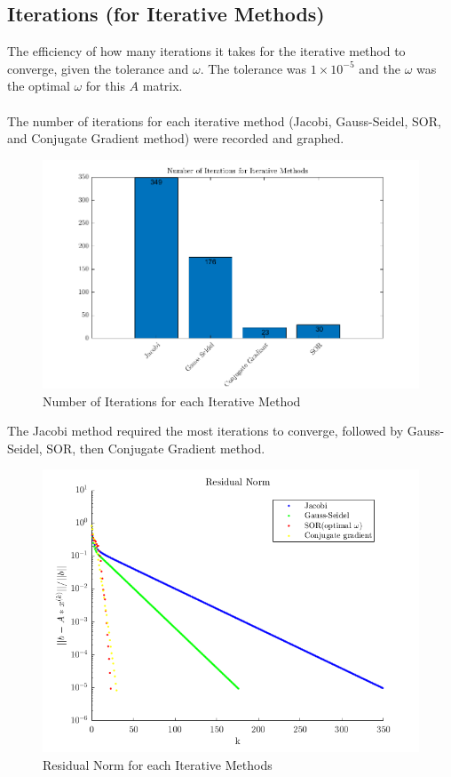 \documentclass[12pt,a4paper]{article}
\begin{document}
\subsection{Iterations (for Iterative Methods)}
The efficiency of how many iterations it takes for the iterative method to converge, given the tolerance and $\omega$. The tolerance was $1\times10^{-5}$ and the $\omega$ was the optimal $\omega$ for this $A$ matrix.
\\\\
The number of iterations for each iterative method (Jacobi, Gauss-Seidel, SOR, and Conjugate Gradient method) were recorded and graphed.
\begin{figure}[H]
	\includegraphics[width=\linewidth]{images/IterationsGraph.png}
	\caption{Number of Iterations for each Iterative Method}
	\label{fig:iterations}
\end{figure} 
The Jacobi method required the most iterations to converge, followed by Gauss-Seidel, SOR, then Conjugate Gradient method.
\begin{figure}[H]
	\includegraphics[width=\linewidth]{images/ResidualNormGraph.png}
	\caption{Residual Norm for each Iterative Methods}
	\label{fig:res}
\end{figure}
\end{document}

